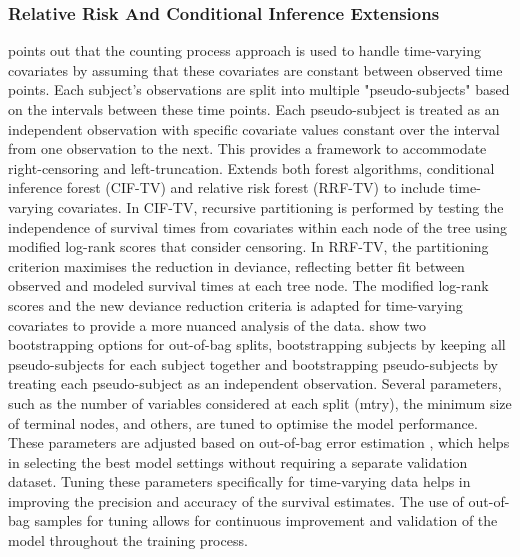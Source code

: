 \subsubsection{Relative Risk And Conditional Inference Extensions}
\noindent \parencite{yao_ensemble_2022} points out that the counting process approach is used to handle time-varying covariates by assuming that these covariates are constant between observed time points. Each subject's observations are split into multiple "pseudo-subjects" based on the intervals between these time points. Each pseudo-subject is treated as an independent observation with specific covariate values constant over the interval from one observation to the next. This provides a framework to accommodate right-censoring and left-truncation. \parencite{yao_ensemble_2022} Extends both forest algorithms, conditional inference forest (CIF-TV) and relative risk forest (RRF-TV) to include time-varying covariates. In CIF-TV, recursive partitioning is performed by testing the independence of survival times from covariates within each node of the tree using modified log-rank scores that consider censoring. In RRF-TV, the partitioning criterion maximises the reduction in deviance, reflecting better fit between observed and modeled survival times at each tree node. The modified log-rank scores and the new deviance reduction criteria is adapted for time-varying covariates to provide a more nuanced analysis of the data. \parencite{yao_ensemble_2022} show two bootstrapping options for out-of-bag splits, bootstrapping subjects by keeping all pseudo-subjects for each subject together and bootstrapping pseudo-subjects by treating each pseudo-subject as an independent observation. Several parameters, such as the number of variables considered at each split (mtry), the minimum size of terminal nodes, and others, are tuned to optimise the model performance. These parameters are adjusted based on out-of-bag error estimation \parencite{yao_ensemble_2022}, which helps in selecting the best model settings without requiring a separate validation dataset. Tuning these parameters specifically for time-varying data helps in improving the precision and accuracy of the survival estimates. The use of out-of-bag samples for tuning allows for continuous improvement and validation of the model throughout the training process.

